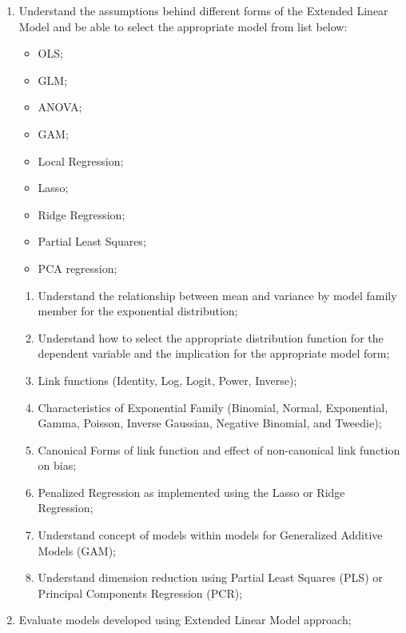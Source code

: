 \documentclass[12pt, titlepage, french]{report}
\begin{document}
\begin{outcomes}
\begin{enumerate}
	\item	Understand the assumptions behind different forms of the Extended Linear Model and be able to select the appropriate model from list below:
	\begin{multicols*}{2}
		\begin{itemize}
		\item	OLS;
		\item	GLM;
		\item	ANOVA;
		\item	GAM;
		\item	Local Regression;
		\item	Lasso;
		\item	Ridge Regression;
		\item	Partial Least Squares;
		\item	PCA regression;
		\end{itemize}
	\end{multicols*}
	\begin{knowledge}
	\begin{enumerate}[label = \alph*.]
		\item	Understand the relationship between mean and variance by model family member for the exponential distribution;
		\item	Understand how to select the appropriate distribution function for the dependent variable and the implication for the appropriate model form;
		\item	Link functions (Identity, Log, Logit, Power, Inverse);
		\item	Characteristics of Exponential Family (Binomial, Normal, Exponential, Gamma, Poisson, Inverse Gaussian, Negative Binomial, and Tweedie);
		\item	Canonical Forms of link function and effect of non-canonical link function on bias;
		\item	Penalized Regression as implemented using the Lasso or Ridge Regression;
		\item	Understand concept of models within models for Generalized Additive Models (GAM);
		\item	Understand dimension reduction using Partial Least Squares (PLS) or Principal Components Regression (PCR);
	\end{enumerate}
	\end{knowledge}
\tcbline
	\item	Evaluate models developed using Extended Linear Model approach;

\end{enumerate}
\end{outcomes}
\end{document}
